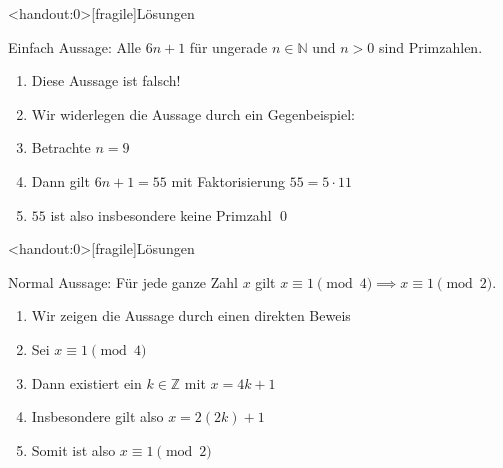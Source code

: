 {
\begin{frame}<handout:0>[fragile]{Lösungen}   
    \begin{block}{Einfach}
        Aussage: Alle $6n+1$ für ungerade $n \in \mathbb{N}$ und $n > 0$ sind Primzahlen.
        \begin{enumerate}
            \item<1-> Diese Aussage ist falsch!
            \item<2-> Wir widerlegen die Aussage durch ein Gegenbeispiel:
            \item<3-> Betrachte $n = 9$
            \item<4-> Dann gilt $6n+1 = 55$ mit Faktorisierung $55 = 5 \cdot 11$
            \item<5-> $55$ ist also insbesondere keine Primzahl \qed
        \end{enumerate}
    \end{block}
\end{frame}
}

{
\begin{frame}<handout:0>[fragile]{Lösungen}   
    \begin{block}{Normal}
        Aussage: Für jede ganze Zahl $x$ gilt $x\equiv 1\pmod 4 \implies x\equiv 1\pmod 2$.
        \begin{enumerate}
            \item<2-> Wir zeigen die Aussage durch einen direkten Beweis 
            \item<3-> Sei $x \equiv 1 \pmod{4}$
            \item<4-> Dann existiert ein $k \in \mathbb{Z}$ mit $x = 4k + 1$
            \item<5-> Insbesondere gilt also $x = 2(2k)+1$
            \item<6-> Somit ist also $x \equiv 1 \pmod{2}$
        \end{enumerate}
    \end{block}
\end{frame}
}

